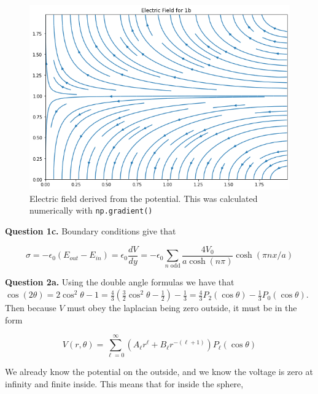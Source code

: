 \documentclass[letterpaper, reqno,11pt]{article}
\newcommand{\ep}{\epsilon}
\begin{document}
\begin{figure}[htbp]
\centering
\includegraphics[width=\textwidth]{q1bii}
\caption{Electric field derived from the potential. This was calculated numerically with \texttt{np.gradient()}}
\label{fig:1bii}
\end{figure}

{\noindent\bf Question 1c.} Boundary conditions give that 

\[
    \sigma=-\epsilon_0(E_{out}-E_{in})=\ep_0\frac{dV}{dy}=-\epsilon_0\sum_{n\text{ odd}}\frac{4V_0}{a\cosh(n\pi)}\cosh(\pi nx/a)
\]





{\noindent\bf Question 2a.} Using the double angle formulas we have that $\cos(2\theta)=2\cos^2\theta-1=\frac43(\frac32\cos^2\theta-\frac12)-\frac13=\frac43P_2(\cos\theta)-\frac13P_0(\cos\theta)$. Then because $V$ must obey the laplacian being zero outside, it must be in the form

\[
    V(r, \theta)=\sum_{\ell=0}^\infty(A_\ell r^\ell+B_\ell r^{-(\ell+1)})P_\ell(\cos\theta)
\]

We already know the potential on the outside, and we know the voltage is zero at infinity and finite inside. This means that for inside the sphere, 
\end{document}
